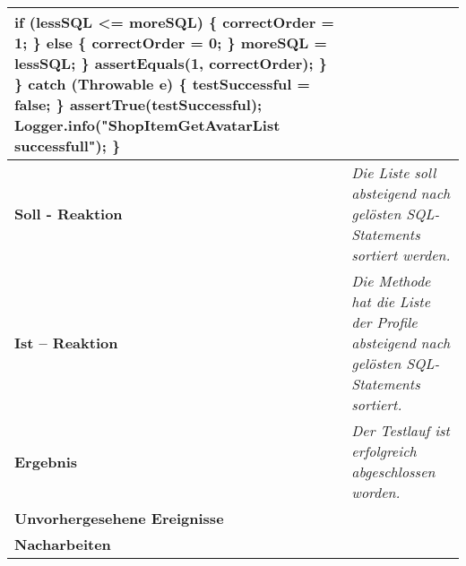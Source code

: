 \begin{longtable}{|p{4cm}|p{11cm}|}
{\hspace*{12mm}                if (lessSQL <= moreSQL) \{ \newline
\hspace*{15mm}                    correctOrder = 1; \newline
\hspace*{12mm}                \} else \{ \newline
\hspace*{15mm}                    correctOrder = 0; \newline
\hspace*{12mm}                \} \newline
\hspace*{12mm}                moreSQL = lessSQL; \newline
\hspace*{9mm}            \} \newline
\hspace*{9mm}            assertEquals(1, correctOrder); \newline
\hspace*{6mm}        \} \newline
\hspace*{3mm}    \} catch (Throwable e) \{ \newline
\hspace*{6mm}        testSuccessful = false; \newline
\hspace*{3mm}    \} \newline
\hspace*{3mm}    assertTrue(testSuccessful); \newline
\hspace*{3mm}    Logger.info("ShopItemGetAvatarList successfull"); \newline
\} \newline
} \\
\hline
\textbf{Soll - Reaktion} & \textit{Die Liste soll absteigend nach gelösten SQL-Statements sortiert werden.} \\
\hline
\textbf{Ist -- Reaktion} & \textit{Die Methode hat die Liste der Profile absteigend nach gelösten SQL-Statements sortiert.} \\
\hline
\textbf{Ergebnis} & \textit{Der Testlauf ist erfolgreich abgeschlossen worden.} \\
\hline
\textbf{Unvorhergesehene Ereignisse} &
\textit{} \\
\hline
\textbf{Nacharbeiten } & \textit{} \\
\hline
\end{longtable}

